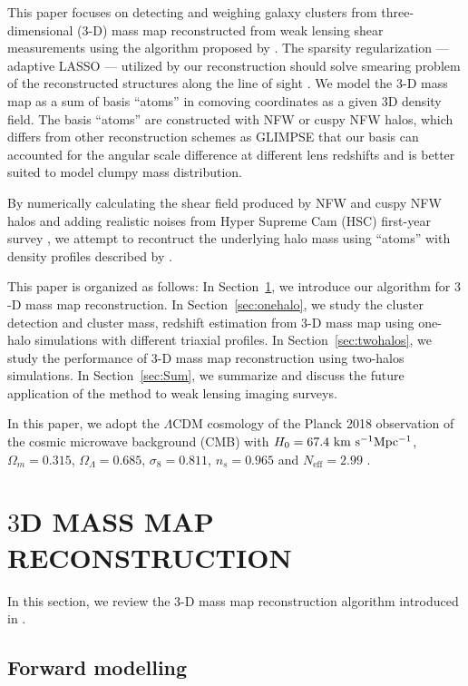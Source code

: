 \documentclass[twocolumn, usenames, dvipsnames]{aastex63}
\begin{document}
This paper focuses on detecting and weighing galaxy clusters from
three-dimensional (3-D) mass map reconstructed from weak lensing shear
measurements using the algorithm proposed by \citet{massmap_Li2021}. The
sparsity regularization --- adaptive LASSO \citep{AdaLASSO-Zou2006} ---
utilized by our reconstruction should solve smearing problem of the
reconstructed structures along the line of sight \citep{massMap_HST_Massey2007,
massmap_Hu2002}. We model the 3-D mass map as a sum of basis ``atoms'' in
comoving coordinates as a given 3D density field. The basis ``atoms'' are
constructed with NFW \citep{halo_nfw} or cuspy NFW \citep{halo_JS02} halos,
which differs from other reconstruction schemes as GLIMPSE
\citep{Glimpse3D_Leonard2014} that our basis can accounted for the angular
scale difference at different lens redshifts and is better suited to model
clumpy mass distribution.

By numerically calculating the shear field produced by NFW and cuspy NFW halos
and adding realistic noises from Hyper Supreme Cam (HSC) first-year survey
\citep{Mandelbaum2017_HSCY1}, we attempt to recontruct the underlying halo mass
using ``atoms'' with density profiles described by \citet{halo_OLS03}.

This paper is organized as follows: In Section~\ref{sec:massmap}, we introduce
our algorithm for $3$-D mass map reconstruction. In Section~\ref{sec:onehalo},
we study the cluster detection and cluster mass, redshift estimation from $3$-D
mass map using one-halo simulations with different triaxial profiles. In
Section~\ref{sec:twohalos}, we study the performance of $3$-D mass map
reconstruction using two-halos simulations. In Section~\ref{sec:Sum}, we
summarize and discuss the future application of the method to weak lensing
imaging surveys.

In this paper, we adopt the $\Lambda$CDM cosmology of the Planck 2018
observation of the cosmic microwave background (CMB) with $H_0=67.4
~\rm{km~s^{-1} Mpc^{-1}}$, $\Omega_m=0.315$, $\Omega_\Lambda=0.685$,
$\sigma_8=0.811$, $n_s=0.965$ and $N_{\text{eff}}=2.99$
\citep{cmb-Planck2018-Cosmology}.

\section{$3$D MASS MAP RECONSTRUCTION}
\label{sec:massmap}
In this section, we review the 3-D mass map reconstruction
algorithm introduced in \citet{massmap_Li2021}.

\subsection{Forward modelling}
\label{sec:massmap_forward}
\end{document}

